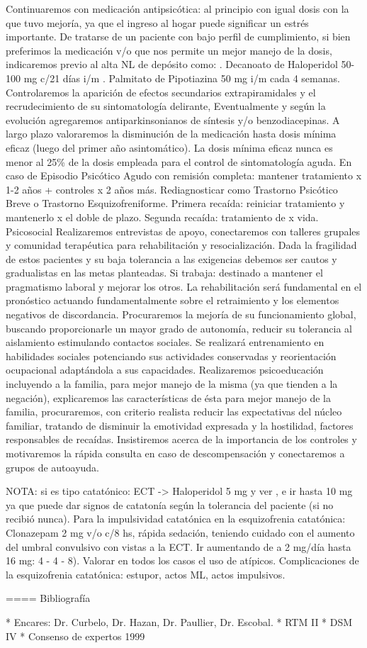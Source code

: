 Continuaremos con medicación antipsicótica: al principio con igual dosis con la que tuvo mejoría, ya que el ingreso al hogar puede significar un estrés importante. De tratarse de un paciente con bajo perfil de cumplimiento, si bien preferimos la medicación v/o que nos permite un mejor manejo de la dosis, indicaremos previo al alta NL de depósito como: . Decanoato de Haloperidol 50-100 mg c/21 días i/m . Palmitato de Pipotiazina 50 mg i/m cada 4 semanas. Controlaremos la aparición de efectos secundarios extrapiramidales y el recrudecimiento de su sintomatología delirante, Eventualmente y según la evolución agregaremos antiparkinsonianos de síntesis y/o benzodiacepinas. A largo plazo valoraremos la disminución de la medicación hasta dosis mínima eficaz (luego del primer año asintomático). La dosis mínima eficaz nunca es menor al 25\% de la dosis empleada para el control de sintomatología aguda. En caso de Episodio Psicótico Agudo con remisión completa: mantener tratamiento x 1-2 años + controles x 2 años más. Rediagnosticar como Trastorno Psicótico Breve o Trastorno Esquizofreniforme. Primera recaída: reiniciar tratamiento y mantenerlo x el doble de plazo. Segunda recaída: tratamiento de x vida. Psicosocial Realizaremos entrevistas de apoyo, conectaremos con talleres grupales y comunidad terapéutica para rehabilitación y resocialización. Dada la fragilidad de estos pacientes y su baja tolerancia a las exigencias debemos ser cautos y gradualistas en las metas planteadas. Si trabaja: destinado a mantener el pragmatismo laboral y mejorar los otros. La rehabilitación será fundamental en el pronóstico actuando fundamentalmente sobre el retraimiento y los elementos negativos de discordancia. Procuraremos la mejoría de su funcionamiento global, buscando proporcionarle un mayor grado de autonomía, reducir su tolerancia al aislamiento estimulando contactos sociales. Se realizará entrenamiento en habilidades sociales potenciando sus actividades conservadas y reorientación ocupacional adaptándola a sus capacidades. Realizaremos psicoeducación incluyendo a la familia, para mejor manejo de la misma (ya que tienden a la negación), explicaremos las características de ésta para mejor manejo de la familia, procuraremos, con criterio realista reducir las expectativas del núcleo familiar, tratando de disminuir la emotividad expresada y la hostilidad, factores responsables de recaídas. Insistiremos acerca de la importancia de los controles y motivaremos la rápida consulta en caso de descompensación y conectaremos a grupos de autoayuda.

NOTA: si es tipo catatónico: ECT -> Haloperidol 5 mg y ver , e ir hasta 10 mg ya que puede dar signos de catatonía según la tolerancia del paciente (si no recibió nunca). Para la impulsividad catatónica en la esquizofrenia catatónica: Clonazepam 2 mg v/o c/8 hs, rápida sedación, teniendo cuidado con el aumento del umbral convulsivo con vistas a la ECT. Ir aumentando de a 2 mg/día hasta 16 mg: 4 - 4 - 8). Valorar en todos los casos el uso de atípicos. Complicaciones de la esquizofrenia catatónica: estupor, actos ML, actos impulsivos.

==== Bibliografía

* Encares: Dr. Curbelo, Dr. Hazan, Dr. Paullier, Dr. Escobal.
* RTM II
* DSM IV
* Consenso de expertos 1999
